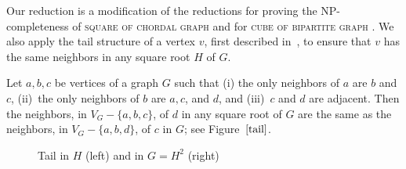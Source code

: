 \documentclass[proceedings]{stacs}
\newlength{\ai}
\begin{document}
Our reduction is a modification of the reductions
for proving the NP-completeness of \textsc{square of chordal graph} \cite[Theorem 3.5]{LauCor2004}
and for \textsc{cube of bipartite graph} \cite[Theorem 7.6]{Lau2006}.
We also apply the tail structure of a vertex $v$, first described in~\cite{MotSud1994},
to ensure that $v$ has the same neighbors in any square root $H$ of $G$.

\begin{lemma}\label{lem:tail}
Let $a, b, c$ be vertices of a graph $G$ such that (i) the only neighbors of $a$ are $b$ and $c$,
(ii)~the only neighbors of $b$ are $a, c$, and $d$, and
(iii)~$c$ and $d$ are adjacent.
Then the neighbors, in $V_G-\{a,b,c\}$, of $d$ in any square root of $G$ are the same as the
neighbors, in $V_G-\{a,b,d\}$, of $c$ in $G$; see Figure~$\ref{tail}$.
\end{lemma}
\begin{figure}[H]
  \begin{center}
    \caption{Tail in $H$ (left) and in $G=H^2$ (right)}
    \label{tail}
  \end{center}
\end{figure}
\end{document}
